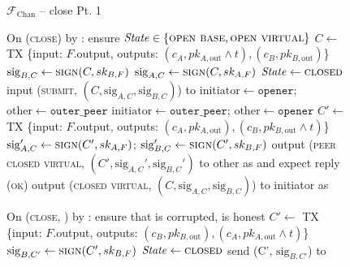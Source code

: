 \begin{figure}[H]
  \begin{systembox}{$\mathcal{F}_{\mathrm{Chan}}$ -- close Pt. 1}
    \begin{algorithmic}[1]
      \State On (\textsc{close}) by \alice:
      \Indent
        \State ensure $\mathit{State} \in \{\textsc{open base}, \textsc{open
        virtual}\}$
          \State $C \gets$ TX \{input: $F$.output, outputs: $(c_A, pk_{A,
          \mathrm{out}} \wedge t), (c_B, pk_{B, \mathrm{out}})$\}
          \State $\mathrm{sig}_{B, C} \gets \textsc{sign}(C, sk_{B, F})$
        \EndIf {}
        \State $\mathrm{sig}_{A, C} \gets \textsc{sign}(C, sk_{A, F})$
        \State $\mathit{State} \gets \textsc{closed}$
          \State input (\textsc{submit}, $(C, \mathrm{sig}_{A, C},
          \mathrm{sig}_{B, C})$) to \ledger
           
            \State $\mathrm{initiator} \gets \mathtt{opener}$; $\mathrm{other}
            \gets \mathtt{outer\_peer}$
          \Else
            \State $\mathrm{initiator} \gets \mathtt{outer\_peer}$;
            $\mathrm{other} \gets \mathtt{opener}$
          \EndIf
            \State $C' \gets$ TX \{input: $F$.output, outputs: $(c_A, pk_{A,
            \mathrm{out}}), (c_B, pk_{B, \mathrm{out}} \wedge t)$\}
            \State $\mathrm{sig}_{A, C}' \gets \textsc{sign}(C', sk_{A, F})$;
            $\mathrm{sig}_{B, C}' \gets \textsc{sign}(C', sk_{B, F})$
            \State output (\textsc{peer closed virtual}, $(C', \mathrm{sig}_{A,
            C}', \mathrm{sig}_{B, C}')$ to other as \bob and expect reply
            (\textsc{ok})
          \EndIf
          \State output (\textsc{closed virtual}, $(C, \mathrm{sig}_{A, C},
          \mathrm{sig}_{B, C})$) to initiator as \alice
        \EndIf
      \EndIndent
      \Statex

      \State On (\textsc{close}, \alice) by \adversary:
      \Indent
        \State ensure that \alice is corrupted, \bob is honest
        \State $C' \gets$ TX \{input: $F$.output, outputs: $(c_B, pk_{B,
        \mathrm{out}}), (c_A, pk_{A, \mathrm{out}} \wedge t)$\}
        \State $\mathrm{sig}_{B, C'} \gets \textsc{sign}(C', sk_{B, F})$
        \State $\mathit{State} \gets \textsc{closed}$
        \State send (C', $\mathrm{sig}_{B, C'}$) to \adversary
        \State {}
      \EndIndent
    \end{algorithmic}
  \end{systembox}
  \caption{}
  \label{code:functionality:chan:skeleton:close:pt1}
\end{figure}

